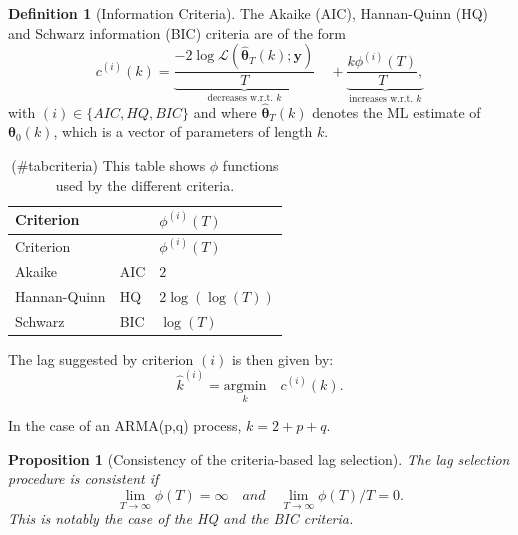 \documentclass[
  11pt,
]{book}
\newtheorem{proposition}{Proposition}[chapter]
\theoremstyle{definition}
\newtheorem{definition}{Definition}[chapter]
\theoremstyle{definition}
\theoremstyle{definition}
\theoremstyle{definition}
\theoremstyle{remark}
\begin{document}
\begin{definition}[Information Criteria]
\protect\hypertarget{def:infocriteria}{}\label{def:infocriteria}The Akaike (AIC), Hannan-Quinn (HQ) and Schwarz information (BIC) criteria are of the form
\[
c^{(i)}(k) = \underbrace{\frac{- 2 \log \mathcal{L}(\hat{\boldsymbol\theta}_T(k);\mathbf{y})}{T}}_{\mbox{decreases w.r.t. $k$}} \quad +
\underbrace{
\frac{k\phi^{(i)}(T)}{T},}_{\mbox{increases w.r.t. $k$}}
\]
with \((i) \in\{AIC,HQ,BIC\}\) and where \(\hat{\boldsymbol\theta}_T(k)\) denotes the ML estimate of \(\boldsymbol\theta_0(k)\), which is a vector of parameters of length \(k\).

\begin{longtable}[]{@{}lll@{}}
\caption{(\#tabcriteria) This table shows \(\phi\) functions used by the different criteria.}\tabularnewline
\toprule\noalign{}
Criterion & & \(\phi^{(i)}(T)\) \\
\midrule\noalign{}
\endfirsthead
\toprule\noalign{}
Criterion & & \(\phi^{(i)}(T)\) \\
\midrule\noalign{}
\endhead
\bottomrule\noalign{}
\endlastfoot
Akaike & AIC & \(2\) \\
Hannan-Quinn & HQ & \(2\log(\log(T))\) \\
Schwarz & BIC & \(\log(T)\) \\
\end{longtable}

The lag suggested by criterion \((i)\) is then given by:
\[
\boxed{\hat{k}^{(i)} = \underset{k}{\mbox{argmin}} \quad c^{(i)}(k).}
\]
\end{definition}

In the case of an ARMA(p,q) process, \(k=2+p+q\).

\begin{proposition}[Consistency of the criteria-based lag selection]
\protect\hypertarget{prp:infocriteria}{}\label{prp:infocriteria}The lag selection procedure is consistent if
\[
\lim_{T \rightarrow \infty} \phi(T) = \infty \quad and \quad \lim_{T \rightarrow \infty} \phi(T)/T = 0.
\]
This is notably the case of the HQ and the BIC criteria.
\end{proposition}
\end{document}
